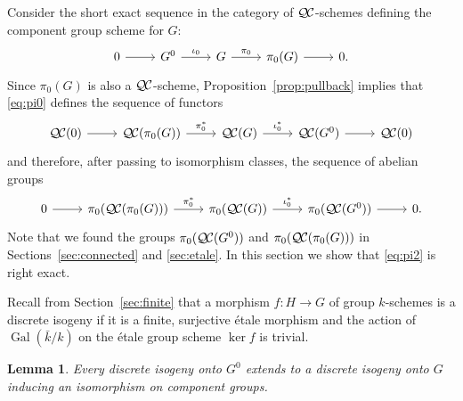 \documentclass{amsart}
\theoremstyle{plain}
\newtheorem{lemma}[theorem]{Lemma}
\theoremstyle{definition}
\theoremstyle{remark}
\newcommand{\bFq}{\bar{k}}
\newcommand{\Fq}{k}
\DeclareMathOperator{\Gal}{Gal}
\newcommand{\QC}{{\mathcal{Q\hskip-0.8pt C}}}
\newcommand{\QCiso}[1]{\pi_0 (\QC(#1))}
\begin{document}
Consider the short exact sequence in the category of $\QC$-schemes
defining the component group scheme for $G$:
\begin{equation}\label{eq:pi0}
\begin{tikzcd}
0 \rar & G^0 \arrow{r}{\iota_0} & G \arrow{r}{\pi_0} & \pi_0(G) \rar & 0.
\end{tikzcd}
\end{equation}
Since $\pi_0(G)$ is also a $\QC$-scheme, 
Proposition~\ref{prop:pullback} implies that \eqref{eq:pi0} defines the sequence of functors
\begin{equation}\label{eq:pi1}
\begin{tikzcd}
\QC(0) \rar & \QC(\pi_0(G)) \arrow{r}{\pi_0^*} & \QC(G) \arrow{r}{\iota_0^*} & \QC(G^0) \rar & \QC(0)
\end{tikzcd}
\end{equation}
and therefore, after passing to isomorphism classes, the sequence of abelian groups 
\begin{equation}\label{eq:pi2}
\begin{tikzcd}
0 \rar & \QCiso{\pi_0(G)} \arrow{r}{\pi_0^*} & \QCiso{G} \arrow{r}{\iota_0^*} & \QCiso{G^0} \rar & 0.
\end{tikzcd}
\end{equation}
 Note that we found the groups $\QCiso{G^0}$
and $\QCiso{\pi_0(G)}$
in Sections~\ref{sec:connected} and \ref{sec:etale}.
In this section we show that \eqref{eq:pi2} is right exact.

Recall from Section~\ref{sec:finite} that 
a morphism $f : H\to G$ of group $\Fq$-schemes is a discrete isogeny 
if it is a finite, surjective \'etale morphism and 
the action of $\Gal(\bFq/\Fq)$ on the \'etale group scheme $\ker f$ is trivial.

\begin{lemma}\label{lemma:ext}
Every discrete isogeny onto $G^0$ extends to a discrete
isogeny onto $G$ inducing an isomorphism on component groups.
\end{lemma}
\end{document}
